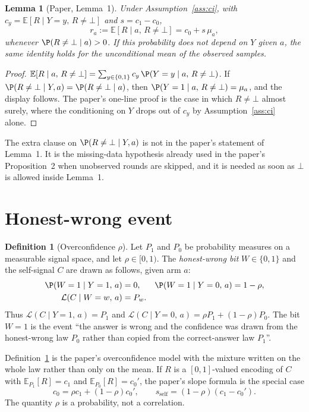 \documentclass{article}
\newtheorem{lemma}[theorem]{Lemma}
\theoremstyle{definition}
\newtheorem{definition}[theorem]{Definition}
\theoremstyle{remark}
\newcommand{\E}{\mathbb{E}}
\begin{document}
\begin{lemma}[Paper, Lemma~1]\label{lem:affine}
Under Assumption~\ref{ass:ci}, with $c_y=\E[R\mid Y=y,\,R\neq\bot]$ and $s=c_1-c_0$,
\[
r_a:=\E[R\mid a,\,R\neq\bot]=c_0+s\,\mu_a,
\]
whenever $\P(R\neq\bot\mid a)>0$. If this probability does not depend on $Y$ given $a$, the same identity holds for the unconditional mean of the observed samples.
\end{lemma}

\begin{proof}
$\E[R\mid a,\,R\neq\bot]=\sum_{y\in\{0,1\}}c_y\,\P(Y=y\mid a,\,R\neq\bot)$. If $\P(R\neq\bot\mid Y,a)=\P(R\neq\bot\mid a)$, then $\P(Y=1\mid a,\,R\neq\bot)=\mu_a$, and the display follows. The paper's one-line proof is the case in which $R\neq\bot$ almost surely, where the conditioning on $Y$ drops out of $c_y$ by Assumption~\ref{ass:ci} alone.
\end{proof}

The extra clause on $\P(R\neq\bot\mid Y,a)$ is not in the paper's statement of Lemma~1. It is the missing-data hypothesis already used in the paper's Proposition~2 when unobserved rounds are skipped, and it is needed as soon as $\bot$ is allowed inside Lemma~1.

\section{Honest-wrong event}
\begin{definition}[Overconfidence $\rho$]\label{def:rho}
Let $P_1$ and $P_0$ be probability measures on a measurable signal space, and let $\rho\in[0,1)$. The \emph{honest-wrong bit} $W\in\{0,1\}$ and the self-signal $C$ are drawn as follows, given arm $a$:
\begin{align*}
\P(W=1\mid Y=1,\,a)&=0, &
\P(W=1\mid Y=0,\,a)&=1-\rho,\\
\mathcal L(C\mid W=w,\,a)&=P_w.
\end{align*}
Thus $\mathcal L(C\mid Y=1,\,a)=P_1$ and $\mathcal L(C\mid Y=0,\,a)=\rho P_1+(1-\rho)P_0$. The bit $W=1$ is the event ``the answer is wrong and the confidence was drawn from the honest-wrong law $P_0$ rather than copied from the correct-answer law $P_1$''.
\end{definition}

Definition~\ref{def:rho} is the paper's overconfidence model with the mixture written on the whole law rather than only on the mean. If $R$ is a $[0,1]$-valued encoding of $C$ with $\E_{P_1}[R]=c_1$ and $\E_{P_0}[R]=c_0'$, the paper's slope formula is the special case
\[
c_0=\rho c_1+(1-\rho)c_0',\qquad s_{\mathrm{self}}=(1-\rho)(c_1-c_0').
\]
The quantity $\rho$ is a probability, not a correlation.
\end{document}
